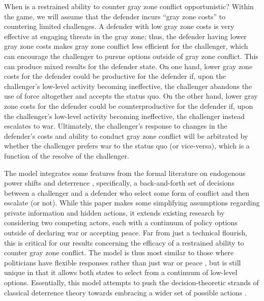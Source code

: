 \documentclass[11pt,letterpaper,pdftex,dvipsnames,table]{article}
\begin{document}
When is a restrained ability to counter gray zone conflict opportunistic? Within the game, we will assume that the defender incurs ``gray zone costs'' to countering limited challenges. A defender with low gray zone costs is very effective at engaging threats in the gray zone; thus, the defender having lower gray zone costs makes gray zone conflict less efficient for the challenger, which can encourage the challenger to pursue options outside of gray zone conflict. This can produce mixed results for the defender state. On one hand, lower gray zone costs for the defender could be productive for the defender if, upon the challenger's low-level activity becoming ineffective, the challenger abandons the use of force altogether and accepts the status quo. On the other hand, lower gray zone costs for the defender could be counterproductive for the defender if, upon the challenger's low-level activity becoming ineffective, the challenger instead escalates to war. Ultimately, the challenger's response to changes in the defender's costs and ability to conduct gray zone conflict will be arbitrated by whether the challenger prefers war to the status quo (or vice-versa), which is a function of the resolve of the challenger.

The model integrates some features from the formal literature on endogenous power shifts and deterrence \citep{fearon_signalingforeignpolicy_1997, schultz_enforcementproblemcoercive_2010, debs_knownunknownspower_2014, gurantz_fearappeasementeffectiveness_2017, baliga_deterrenceimperfectattribution_2020}, specifically, a back-and-forth set of decisions between a challenger and a defender who select some form of conflict and then escalate (or not). While this paper makes some simplifying assumptions regarding private information and hidden actions, it extends existing research by considering two competing actors, each with a continuum of policy options outside of declaring war or accepting peace. Far from just a technical flourish, this is critical for our results concerning the efficacy of a restrained ability to counter gray zone conflict. The model is thus most similar to those where politicians have flexible responses rather than just war or peace \citep{zagare_deterrencetheoryspiral_1998, schultz_enforcementproblemcoercive_2010, powell_nuclearbrinkmanshiplimited_2015, mccormack_sanctionspreventivewar_2017, coe_containingroguestheory_2018, spaniel_bargainingbombsuccesses_2019, schram_hasslinghowstates_2020, joseph_littlebitcheaptalk_2021}, but is still unique in that it allows both states to select from a continuum of low-level options. Essentially, this model attempts to push the decision-theoretic strands of classical deterrence theory towards embracing a wider set of possible actions \citep{zagare_classicaldeterrencetheory_1996, huth_deterrenceinternationalconflict_1999}. 
\end{document}
